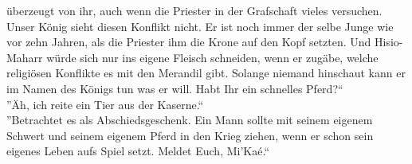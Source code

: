 überzeugt von ihr, auch wenn die Priester in der Grafschaft vieles versuchen. Unser König sieht 
diesen Konflikt nicht. Er ist noch immer der selbe Junge wie vor zehn Jahren, als die Priester ihm 
die Krone auf den Kopf setzten. Und Hisio-Maharr würde sich nur ins eigene Fleisch schneiden, wenn 
er zugäbe, welche religiösen Konflikte es mit den Merandil gibt. Solange niemand hinschaut kann er 
im Namen des Königs tun was er will. Habt Ihr ein schnelles Pferd?``\\
''Äh, ich reite ein Tier aus der Kaserne.``\\
''Betrachtet es als Abschiedsgeschenk. Ein Mann sollte mit seinem eigenem Schwert und seinem 
eigenem Pferd in den Krieg ziehen, wenn er schon sein eigenes Leben aufs Spiel setzt. Meldet 
Euch, Mi'Kaé.`` \\




